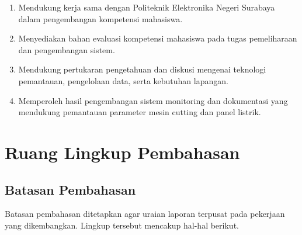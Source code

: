 \begin{enumerate}[leftmargin=*,itemsep=2pt]
\item Mendukung kerja sama dengan Politeknik Elektronika Negeri Surabaya dalam pengembangan kompetensi mahasiswa.

\item Menyediakan bahan evaluasi kompetensi mahasiswa pada tugas pemeliharaan dan pengembangan sistem.

\item Mendukung pertukaran pengetahuan dan diskusi mengenai teknologi pemantauan, pengelolaan data, serta kebutuhan lapangan.

\item Memperoleh hasil pengembangan sistem monitoring dan dokumentasi yang mendukung pemantauan parameter mesin cutting dan panel listrik.
\end{enumerate}

\section{Ruang Lingkup Pembahasan}

\subsection{Batasan Pembahasan}

Batasan pembahasan ditetapkan agar uraian laporan terpusat pada pekerjaan yang dikembangkan. Lingkup tersebut mencakup hal-hal berikut.

